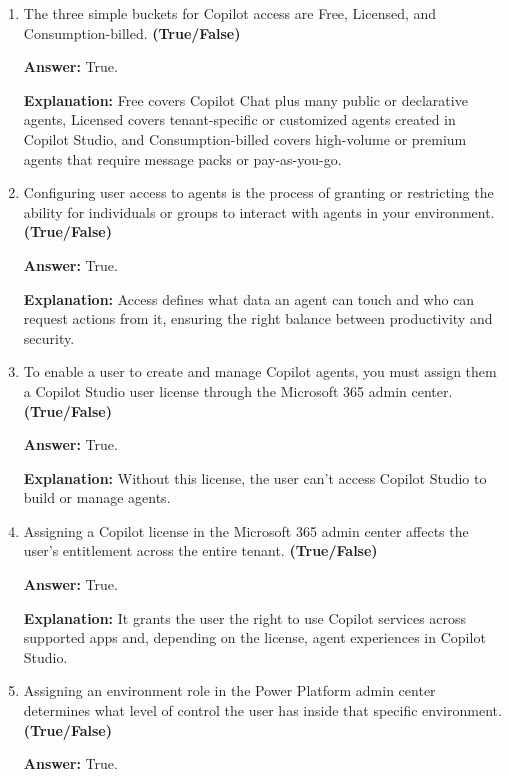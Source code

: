 \documentclass[10pt]{article}
\begin{document}
\begin{enumerate}[leftmargin=*]
\textbf{Answer:} True.

\textbf{Explanation:} The tenant must have capacity configured through the Power Platform admin center for users to publish and run these agents.

\item The three simple buckets for Copilot access are Free, Licensed, and Consumption-billed. \textbf{(True/False)}

\textbf{Answer:} True.

\textbf{Explanation:} Free covers Copilot Chat plus many public or declarative agents, Licensed covers tenant-specific or customized agents created in Copilot Studio, and Consumption-billed covers high-volume or premium agents that require message packs or pay-as-you-go.

\item Configuring user access to agents is the process of granting or restricting the ability for individuals or groups to interact with agents in your environment. \textbf{(True/False)}

\textbf{Answer:} True.

\textbf{Explanation:} Access defines what data an agent can touch and who can request actions from it, ensuring the right balance between productivity and security.

\item To enable a user to create and manage Copilot agents, you must assign them a Copilot Studio user license through the Microsoft 365 admin center. \textbf{(True/False)}

\textbf{Answer:} True.

\textbf{Explanation:} Without this license, the user can’t access Copilot Studio to build or manage agents.

\item Assigning a Copilot license in the Microsoft 365 admin center affects the user’s entitlement across the entire tenant. \textbf{(True/False)}

\textbf{Answer:} True.

\textbf{Explanation:} It grants the user the right to use Copilot services across supported apps and, depending on the license, agent experiences in Copilot Studio.

\item Assigning an environment role in the Power Platform admin center determines what level of control the user has inside that specific environment. \textbf{(True/False)}

\textbf{Answer:} True.


\end{enumerate}
\end{document}
